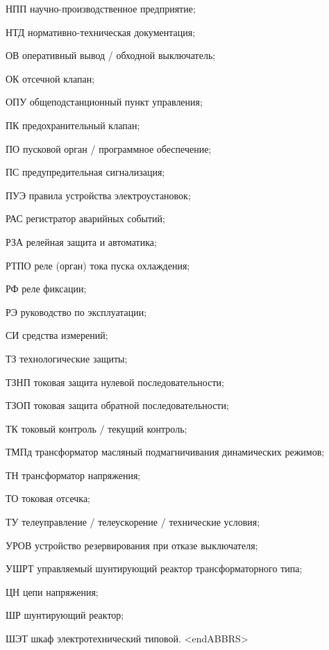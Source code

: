 \begin{list}{}
\item[НПП] научно-производственное предприятие;
\item[НТД] нормативно-техническая документация;
\item[ОВ] оперативный вывод / обходной выключатель;
\item[ОК] отсечной клапан;
\item[ОПУ] общеподстанционный пункт управления;
\item[ПК] предохранительный клапан;
\item[ПО] пусковой орган / программное обеспечение;
\item[ПС] предупредительная сигнализация;
\item[ПУЭ] правила устройства электроустановок;
\item[РАС] регистратор аварийных событий;
\item[РЗА] релейная защита и автоматика;
\item[РТПО] реле (орган) тока пуска охлаждения;
\item[РФ] реле фиксации;
\item[РЭ] руководство по эксплуатации;
\item[СИ] средства измерений;
\item[ТЗ] технологические защиты;
\item[ТЗНП] токовая защита нулевой последовательности;
\item[ТЗОП] токовая защита обратной последовательности;
\item[ТК] токовый контроль / текущий контроль;
\item[ТМПд] трансформатор масляный подмагничивания динамических режимов;
\item[ТН] трансформатор напряжения;
\item[ТО] токовая отсечка;
\item[ТУ] телеуправление / телеускорение / технические условия;
\item[УРОВ] устройство резервирования при отказе выключателя;
\item[УШРТ] управляемый шунтирующий реактор трансформаторного типа;
\item[ЦН] цепи напряжения;
\item[ШР] шунтирующий реактор;
\item[ШЭТ] шкаф электротехнический типовой.
{\color{white}\fontsize{0.1pt}{0.1pt}\selectfont<endABBRS>}
\end{list}
